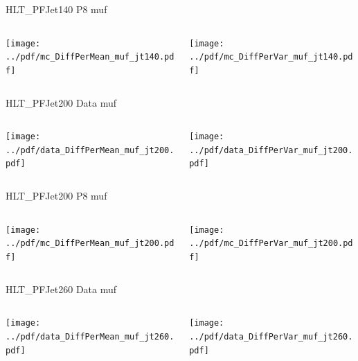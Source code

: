 \documentclass[9pt]{beamer}
\begin{document}
\begin{frame}[t]{HLT\_PFJet140 P8 muf}
\begin{columns}[T]
  \begin{column}{.5\textwidth}
  \texttt{[image: ../pdf/mc\_DiffPerMean\_muf\_jt140.pdf]}
  \end{column}
  \begin{column}{.5\textwidth}
  \texttt{[image: ../pdf/mc\_DiffPerVar\_muf\_jt140.pdf]}
  \end{column}
\end{columns}
\end{frame}

\begin{frame}[t]{HLT\_PFJet200 Data muf}
\begin{columns}[T]
  \begin{column}{.5\textwidth}
  \texttt{[image: ../pdf/data\_DiffPerMean\_muf\_jt200.pdf]}
  \end{column}
  \begin{column}{.5\textwidth}
  \texttt{[image: ../pdf/data\_DiffPerVar\_muf\_jt200.pdf]}
  \end{column}
\end{columns}
\end{frame}

\begin{frame}[t]{HLT\_PFJet200 P8 muf}
\begin{columns}[T]
  \begin{column}{.5\textwidth}
  \texttt{[image: ../pdf/mc\_DiffPerMean\_muf\_jt200.pdf]}
  \end{column}
  \begin{column}{.5\textwidth}
  \texttt{[image: ../pdf/mc\_DiffPerVar\_muf\_jt200.pdf]}
  \end{column}
\end{columns}
\end{frame}

\begin{frame}[t]{HLT\_PFJet260 Data muf}
\begin{columns}[T]
  \begin{column}{.5\textwidth}
  \texttt{[image: ../pdf/data\_DiffPerMean\_muf\_jt260.pdf]}
  \end{column}
  \begin{column}{.5\textwidth}
  \texttt{[image: ../pdf/data\_DiffPerVar\_muf\_jt260.pdf]}
  \end{column}
\end{columns}
\end{frame}
\end{document}
